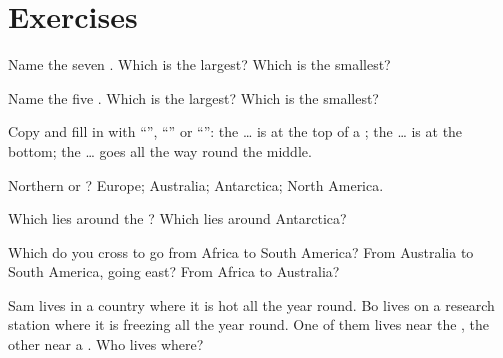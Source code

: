 \section{Exercises}

\begin{exercise}[$\star$]\label{exo:g3:continents-and-oceans:1}
Name the seven . Which is the largest? Which is the smallest?
\end{exercise}

\begin{exercise}[$\star$]\label{exo:g3:continents-and-oceans:2}
Name the five . Which is the largest? Which is the smallest?
\end{exercise}

\begin{exercise}[$\star$]\label{exo:g3:continents-and-oceans:3}
Copy and fill in with ``'', ``'' or ``'': the
\dots{} is at the top of a ; the \dots{} is at the bottom; the \dots{}
goes all the way round the middle.
\end{exercise}

\begin{exercise}[$\star$]\label{exo:g3:continents-and-oceans:4}
Northern or ? Europe; Australia; Antarctica; North
America.
\end{exercise}

\begin{exercise}[$\star$]\label{exo:g3:continents-and-oceans:5}
Which  lies around the ? Which  lies around
Antarctica?
\end{exercise}

\begin{exercise}[$\star\star$]\label{exo:g3:continents-and-oceans:6}
Which  do you cross to go from Africa to South America? From
Australia to South America, going east? From Africa to Australia?
\end{exercise}

\begin{exercise}[$\star\star$]\label{exo:g3:continents-and-oceans:7}
Sam lives in a country where it is hot all the year round. Bo lives on a
research station where it is freezing all the year round. One of them lives
near the , the other near a . Who lives where?
\end{exercise}

